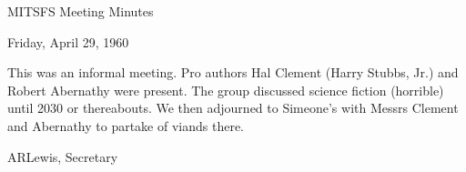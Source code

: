 \documentclass[12pt]{article}
\begin{document}
\begin{center}

MITSFS Meeting Minutes

Friday, April 29, 1960

\end{center}
 
\vspace{12pt}

\setlength{\parskip}{6pt}

\noindent
This was an informal meeting. Pro authors Hal Clement (Harry Stubbs, Jr.) and Robert Abernathy were present. The group discussed science fiction (horrible) until 2030 or thereabouts. We then adjourned to Simeone's with Messrs Clement and Abernathy to partake of viands there.

\vspace{12pt}

\centerline{ARLewis, Secretary}
\end{document}
